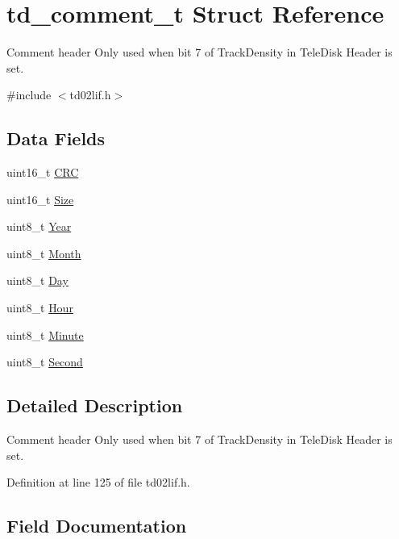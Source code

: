 \hypertarget{structtd__comment__t}{}\section{td\+\_\+comment\+\_\+t Struct Reference}
\label{structtd__comment__t}


Comment header Only used when bit 7 of Track\+Density in Tele\+Disk Header is set.  




{\ttfamily \#include $<$td02lif.\+h$>$}

\subsection*{Data Fields}
\begin{DoxyCompactItemize}
\item 
uint16\+\_\+t \hyperlink{structtd__comment__t_a4bcc6435d5a4408627be9f50ef124211}{C\+RC}
\item 
uint16\+\_\+t \hyperlink{structtd__comment__t_aca61f38ae62a6de2ff0eab7da2c25e11}{Size}
\item 
uint8\+\_\+t \hyperlink{structtd__comment__t_a0c804ec07303f411dd508dc64900aff5}{Year}
\item 
uint8\+\_\+t \hyperlink{structtd__comment__t_ac926fbfad0e3544bb45bb05b7cd66c49}{Month}
\item 
uint8\+\_\+t \hyperlink{structtd__comment__t_ab42475ed36aa4475f76336099fd53acc}{Day}
\item 
uint8\+\_\+t \hyperlink{structtd__comment__t_ae42f4895a24dadba8528e32d89d601c6}{Hour}
\item 
uint8\+\_\+t \hyperlink{structtd__comment__t_a40d01b0af51b4896e0d771e8a458ed87}{Minute}
\item 
uint8\+\_\+t \hyperlink{structtd__comment__t_ae89673be13e6cad1c83bd51034689248}{Second}
\end{DoxyCompactItemize}


\subsection{Detailed Description}
Comment header Only used when bit 7 of Track\+Density in Tele\+Disk Header is set. 

Definition at line 125 of file td02lif.\+h.



\subsection{Field Documentation}
